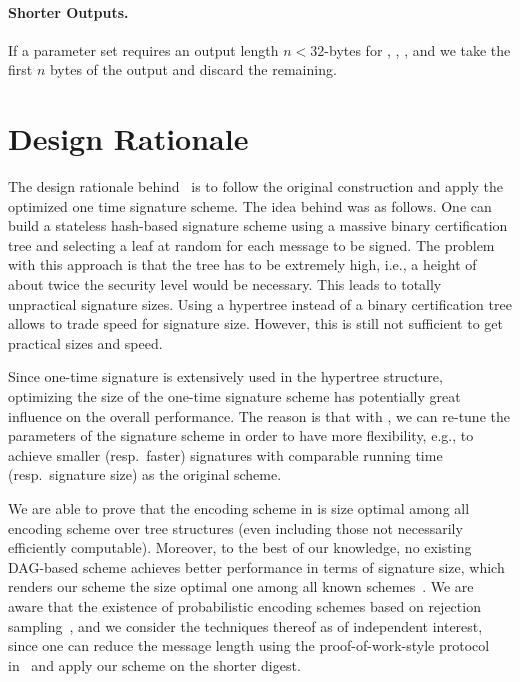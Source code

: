 \paragraph{Shorter Outputs.} 
If a parameter set requires an output length $n<32$-bytes for \hashF, \hashH, \PRF, and \PRFmsg we take the first $n$ bytes of the output and discard the remaining.

\section{Design Rationale}

The design rationale behind \SPHINCSA\ is to follow the original \SPHINCSP construction and apply the optimized \WOTSCS one time signature scheme. The idea behind \SPHINCSP was as follows. One can build a stateless hash-based signature scheme using a massive binary certification tree and selecting a leaf at random for each message to be signed. The problem with this approach is that the tree has to be extremely high, i.e., a height of about twice the security level would be necessary. This leads to totally unpractical signature sizes. Using a hypertree instead of a binary certification tree allows to trade speed for signature size. However, this is still not sufficient to get practical sizes and speed.

Since one-time signature is extensively used in the \SPHINCSP hypertree structure, optimizing the size of the one-time signature scheme has potentially great influence on the overall performance. The reason is that with \WOTSCS, we can re-tune the parameters of the signature scheme in order to have more flexibility, e.g., to achieve smaller (resp.~faster) signatures with comparable running time (resp.~signature size) as the original \SPHINCSP scheme.

We are able to prove that the encoding scheme in \WOTSCS is size optimal among all encoding scheme over tree structures (even including those not necessarily efficiently computable). Moreover, to the best of our knowledge, no existing DAG-based scheme achieves better performance in terms of signature size, which renders our scheme the size optimal one among all known schemes~\cite{optimalwots}. We are aware that the existence of probabilistic encoding schemes based on rejection sampling~\cite{cryptoeprint:2022/778}, and we consider the techniques thereof as of independent interest, since one can reduce the message length using the proof-of-work-style protocol in~\cite{cryptoeprint:2022/778} and apply our scheme on the shorter digest.


